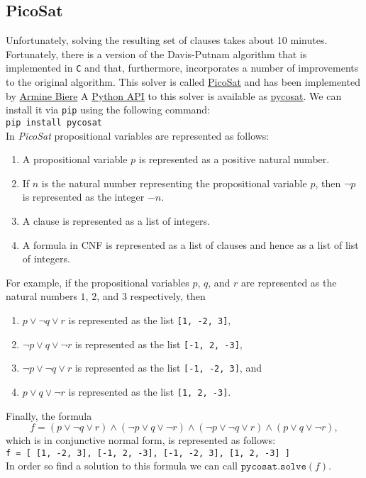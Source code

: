 \subsection{PicoSat}
Unfortunately, solving the resulting set of clauses takes about 10 minutes.  Fortunately, there is a version
of the Davis-Putnam algorithm that is implemented in \texttt{C} and that, furthermore, incorporates a number of
improvements to the original algorithm.  This solver is called \href{https://fmv.jku.at/picosat/}{PicoSat}
and has been implemented by \href{https://cca.informatik.uni-freiburg.de/biere/}{Armine Biere}
A \href{https://github.com/conda/pycosat}{Python API} to this solver is available as
\href{https://pypi.org/project/pycosat/}{pycosat}.  We can install it via \texttt{pip} using the following command:
\\[0.2cm]
\hspace*{1.3cm}
\texttt{pip install pycosat}
\\[0.2cm]
In \textsl{PicoSat} propositional variables are represented as follows:
\begin{enumerate}
\item A propositional variable $p$ is represented as a positive natural number.
\item If $n$ is the natural number representing the propositional variable $p$, then $\neg p$ is represented as
      the integer $-n$. 
\item A clause is represented as a list of integers.
\item A formula in CNF is represented as a list of clauses and hence as a list of list of integers.
\end{enumerate}
For example, if the propositional variables $p$, $q$, and $r$ are represented as the natural numbers
$1$, $2$, and $3$ respectively, then
\begin{enumerate}
\item $p \vee \neg q \vee r$ is represented as the list \texttt{[1, -2, 3]},
\item $\neg p \vee q \vee \neg r$ is represented as the list \texttt{[-1, 2, -3]},
\item $\neg p \vee \neg q \vee r$ is represented as the list \texttt{[-1, -2, 3]}, and
\item $p \vee q \vee \neg r$ is represented as the list \texttt{[1, 2, -3]}.
\end{enumerate}
Finally, the formula 
$$ f = (p \vee \neg q \vee r) \wedge (\neg p \vee q \vee \neg r) \wedge (\neg p \vee \neg q \vee r) \wedge (p \vee q \vee \neg r), $$
which is in conjunctive normal form, is represented as follows:
\\[0.2cm]
\hspace*{1.3cm}
\texttt{f = [ [1, -2, 3], [-1, 2, -3], [-1, -2, 3], [1, 2, -3] ]}
\\[0.2cm]
In order so find a solution to this formula we can call $\texttt{pycosat.solve}(f)$.

